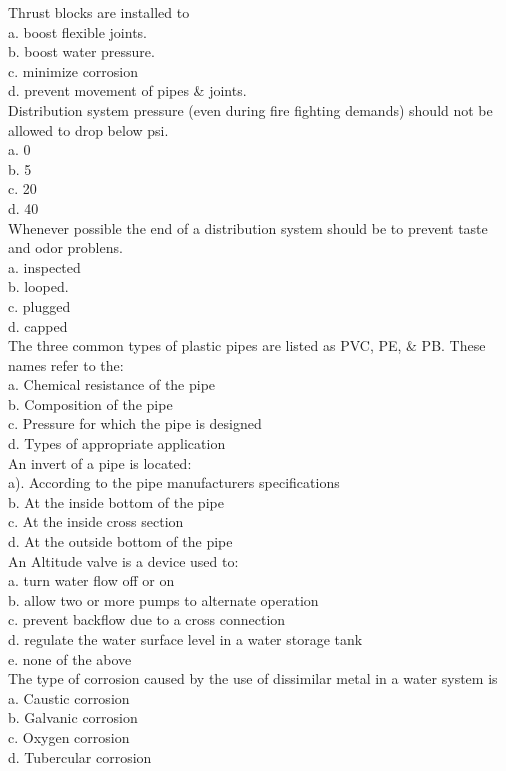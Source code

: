 Thrust blocks are installed to\\
a. boost flexible joints.\\
b. boost water pressure.\\
c. minimize corrosion\\
d. prevent movement of pipes \& joints.\\

Distribution system pressure (even during fire fighting demands) should not be allowed to drop below psi.\\
a. 0\\
b. 5\\
c. 20\\
d. 40\\

Whenever possible the end of a distribution system should be to prevent taste and odor problens.\\
a. inspected\\
b. looped.\\
c. plugged\\
d. capped\\

The three common types of plastic pipes are listed as PVC, PE, \& PB. These names refer to the:\\
a. Chemical resistance of the pipe\\
b. Composition of the pipe\\
c. Pressure for which the pipe is designed\\
d. Types of appropriate application\\

An invert of a pipe is located:\\
a). According to the pipe manufacturers specifications\\
b. At the inside bottom of the pipe\\
c. At the inside cross section\\
d. At the outside bottom of the pipe\\

An Altitude valve is a device used to:\\
a. turn water flow off or on\\
b. allow two or more pumps to alternate operation\\
c. prevent backflow due to a cross connection\\
d. regulate the water surface level in a water storage tank\\
e. none of the above\\


The type of corrosion caused by the use of dissimilar metal in a water system is\\
a. Caustic corrosion\\
b. Galvanic corrosion\\
c. Oxygen corrosion\\
d. Tubercular corrosion\\
